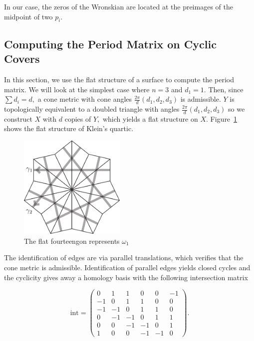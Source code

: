 \documentclass[12pt,reqno]{amsart}
\theoremstyle{definition}
\theoremstyle{remark}
\begin{document}
In our case, the zeros of the Wronskian are located at the preimages of the midpoint of two $p_i.$


\subsection{Computing the Period Matrix on Cyclic Covers}
\label{sec:cyclicperiod}
In this section, we use the flat structure of a surface to compute the period matrix. We will look at the simplest case where $n = 3$ and $d_1 = 1.$ Then, since $\sum d_i = d,$ a cone metric with cone angles $\frac{2 \pi}{d}(d_1, d_2, d_3)$ is admissible. $Y$ is topologically equivalent to a doubled triangle with angles $\frac{2 \pi}{d}(d_1, d_2, d_3)$ so we construct $X$ with $d$ copies of $Y,$ which yields a flat structure on $X.$ Figure~\ref{fig: 124_flat} shows the flat structure of Klein's quartic.  

\begin{figure}[htbp] %
   \centering
   \includegraphics[width=2in]{figures/124_flat} 
	\caption{The flat fourteengon represents $\omega_1$}
	\label{fig: 124_flat}
\end{figure}

The identification of edges are via parallel translations, which verifies that the cone metric is admissible. Identification of parallel edges yields closed cycles and the cyclicity gives away a homology basis with the following intersection matrix

$$\textrm{int} = \begin{pmatrix}
 0 & 1 & 1 & 0 & 0 & -1 \\
 -1 & 0 & 1 & 1 & 0 & 0 \\
 -1 & -1 & 0 & 1 & 1 & 0 \\
 0 & -1 & -1 & 0 & 1 & 1 \\
 0 & 0 & -1 & -1 & 0 & 1 \\
 1 & 0 & 0 & -1 & -1 & 0 
\end{pmatrix}.$$
\end{document}
